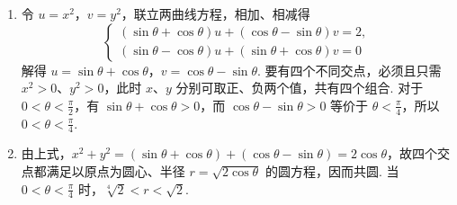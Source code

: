 \begin{solution}
\begin{enumerate}
\item 令 \(u=x^2\)，\(v=y^2\)，联立两曲线方程，相加、相减得
\[
\begin{cases}
(\sin\theta+\cos\theta)u+(\cos\theta-\sin\theta)v=2,\\
(\sin\theta-\cos\theta)u+(\sin\theta+\cos\theta)v=0
\end{cases}
\]
解得 \(u=\sin\theta+\cos\theta\)，\(v=\cos\theta-\sin\theta\). 要有四个不同交点，必须且只需 \(x^2>0\)、\(y^2>0\)，此时 \(x\)、\(y\) 分别可取正、负两个值，共有四个组合. 对于 \(0<\theta<\frac\pi2\)，有 \(\sin\theta+\cos\theta>0\)，而
\(\cos\theta-\sin\theta>0\) 等价于 \(\theta<\frac\pi4\)，所以 \(0<\theta<\frac\pi4\).

\item 由上式，\(x^2+y^2=(\sin\theta+\cos\theta)+(\cos\theta-\sin\theta)=2\cos\theta\)，故四个交点都满足以原点为圆心、半径 \(r=\sqrt{2\cos\theta}\) 的圆方程，因而共圆. 当 \(0<\theta<\frac\pi4\) 时，\(\sqrt[4]{2}<r<\sqrt2\).
\end{enumerate}
\end{solution}

